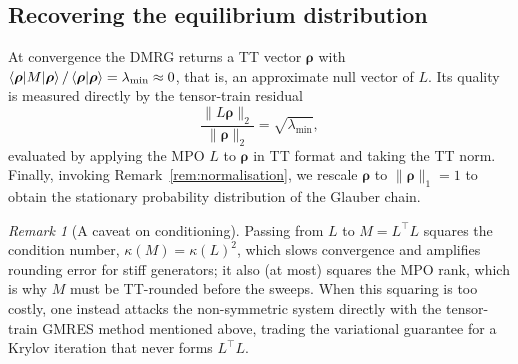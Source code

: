 \documentclass[12pt]{article}
\newcommand{\brho}{\boldsymbol{\rho}}
\theoremstyle{definition}
\theoremstyle{remark}
\newtheorem{remark}[theorem]{Remark}
\begin{document}
\subsection{Recovering the equilibrium distribution}\label{sec:recovery}

At convergence the DMRG returns a TT vector $\brho$ with $\braket{\brho|M|\brho}/\braket{\brho|\brho} = \lambda_{\min} \approx 0$, that is, an approximate null vector of $L$. Its quality is measured directly by the tensor-train residual
\[
\frac{\|L\brho\|_2}{\|\brho\|_2} = \sqrt{\lambda_{\min}},
\]
evaluated by applying the MPO $L$ to $\brho$ in TT format and taking the TT norm. Finally, invoking Remark~\ref{rem:normalisation}, we rescale $\brho$ to $\|\brho\|_1 = 1$ to obtain the stationary probability distribution of the Glauber chain.

\begin{remark}[A caveat on conditioning]
Passing from $L$ to $M = L^\top L$ squares the condition number, $\kappa(M) = \kappa(L)^2$, which slows convergence and amplifies rounding error for stiff generators; it also (at most) squares the MPO rank, which is why $M$ must be TT-rounded before the sweeps. When this squaring is too costly, one instead attacks the non-symmetric system directly with the tensor-train GMRES method mentioned above, trading the variational guarantee for a Krylov iteration that never forms $L^\top L$.
\end{remark}
\end{document}
